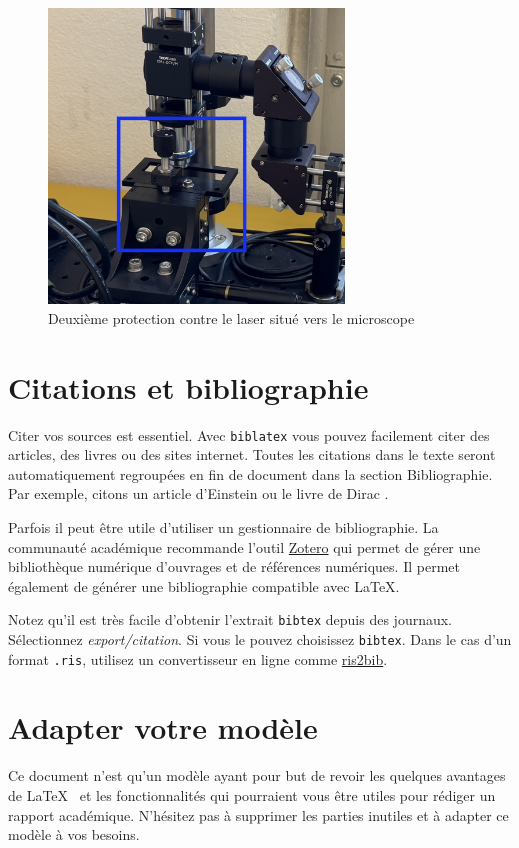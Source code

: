 \begin{figure}[H]
    \begin{center}
        \includegraphics[width=0.7\textwidth]{assets/figures/figures_introduction/protection_fin_laser.jpeg}
    \end{center}
    \caption{Deuxième protection contre le laser situé vers le microscope}
    \label{protection_laser_fin}
\end{figure}







\section{Citations et bibliographie}
Citer vos sources est essentiel. Avec \texttt{biblatex} vous pouvez facilement citer des articles, des livres ou des sites internet. Toutes les citations dans le texte seront automatiquement regroupées en fin de document dans la section \guillemotleft Bibliographie\guillemotright. Par exemple, citons un article d'Einstein \cite{einstein} ou le livre de Dirac \cite{dirac}.

Parfois il peut être utile d'utiliser un gestionnaire de bibliographie. La communauté académique recommande l'outil \href{https://www.zotero.org/}{Zotero} qui permet de gérer une bibliothèque numérique d'ouvrages et de références numériques. Il permet également de générer une bibliographie compatible avec \LaTeX.

Notez qu'il est très facile d'obtenir l'extrait \texttt{bibtex} depuis des journaux. Sélectionnez \emph{export/citation}. Si vous le pouvez choisissez \texttt{bibtex}. Dans le cas d'un format \texttt{.ris}, utilisez un convertisseur en ligne comme \href{http://www.bruot.org/ris2bib/}{ris2bib}.

\section{Adapter votre modèle}
Ce document n'est qu'un modèle ayant pour but de revoir les quelques avantages de \LaTeX~ et les fonctionnalités qui pourraient vous être utiles pour rédiger un rapport académique. N'hésitez pas à supprimer les parties inutiles et à adapter ce modèle à vos besoins.
